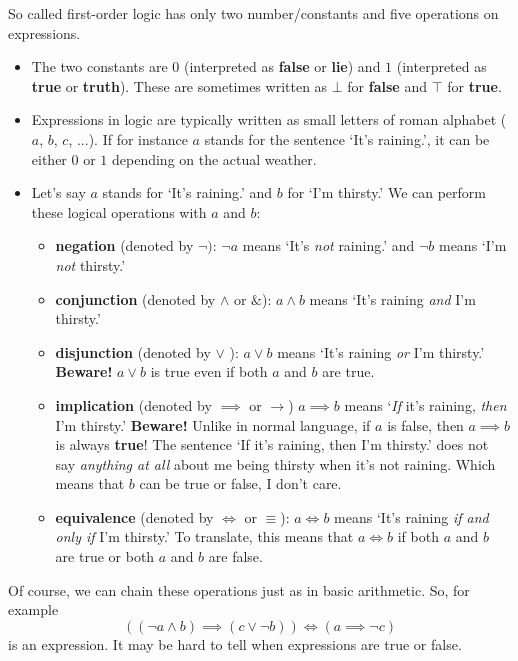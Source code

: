 \documentclass[a4paper,11pt]{article}
\begin{document}
So called first-order logic has only two number/constants and five operations on
expressions.
\begin{itemize}
 \item The two constants are $0$ (interpreted as \textbf{false} or \textbf{lie})
  and $1$ (interpreted as \textbf{true} or \textbf{truth}). These are sometimes
  written as $\bot$ for \textbf{false} and $\top$ for \textbf{true}.
 \item Expressions in logic are typically written as small letters of roman
  alphabet ($a$, $b$, $c$, ...). If for instance $a$ stands for the sentence
  `It's raining.', it can be either $0$ or $1$ depending on the actual weather.
 \item Let's say $a$ stands for `It's raining.' and $b$ for `I'm thirsty.' We
  can perform these logical operations with $a$ and $b$:
  \begin{itemize}
   \item \textbf{negation} (denoted by $\neg)$: $\neg a$ means `It's \emph{not}
    raining.' and $\neg b$ means `I'm \emph{not} thirsty.' 
   \item \textbf{conjunction} (denoted by $ \wedge $ or $\&$): $a \wedge b$ means
    `It's raining \emph{and} I'm thirsty.'
   \item \textbf{disjunction} (denoted by $ \vee $ ): $a \vee b$ means `It's
    raining \emph{or} I'm thirsty.' \textbf{Beware!} $a \vee b$ is true even if
    both $a$ and $b$ are true.
   \item \textbf{implication} (denoted by $ \implies $ or $\rightarrow$) $a
    \implies b$ means `\emph{If} it's raining, \emph{then} I'm thirsty.'
    \textbf{Beware!} Unlike in normal language, if $a$ is false, then $a
    \implies b$ is always \textbf{true}! The sentence `If it's raining, then I'm
    thirsty.' does not say \emph{anything at all} about me being thirsty when
    it's not raining. Which means that $b$ can be true or false, I don't care.
   \item \textbf{equivalence} (denoted by $ \iff $ or $\equiv$):  $a \iff b$ 
    means `It's raining \emph{if and only if} I'm thirsty.' To translate, this
    means that $a \iff b$ if both $a$ and $b$ are true or both $a$ and $b$ are
    false.
  \end{itemize}
 \end{itemize}
 Of course, we can chain these operations just as in basic arithmetic. So, for
 example
 \[
  ((\neg a  \wedge b) \implies (c \vee \neg b)) \iff (a \implies \neg c)
 \]
 is an expression. It may be hard to tell when expressions are true or false.
\end{document}
